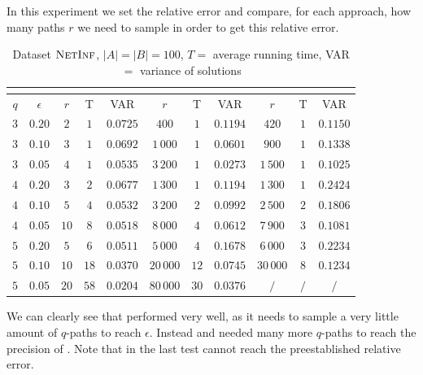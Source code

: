 In this experiment we set the relative error and compare, for each approach, how many paths $r$ we need to sample in order to get this relative error.\medskip

\begin{table}[ht]
	\centering
	\begin{tabular}{|c|c|c|c|c|c|c|c|c|c|c|}
		\cline{3-11}
		\multicolumn{2}{c|}{} & \multicolumn{3}{c|}{\fcount} & \multicolumn{3}{c|}{\fsamp} & \multicolumn{3}{c|}{\base}\\
		\hline	
		$q$ & $\epsilon$ & $r$ & T    & VAR      & $r$ & T    & VAR      & $r$ & T   & VAR      \\ \hline
		$3$ & $0.20$     & $2$  & $1$  & $0.0725$ & $400$     & $1$  & $0.1194$ & $420$     & $1$ & $0.1150$ \\ \hline
		$3$ & $0.10$     & $3$  & $1$  & $0.0692$ & $1\,000$  & $1$  & $0.0601$ & $900$     & $1$ & $0.1338$ \\ \hline
		$3$ & $0.05$     & $4$  & $1$  & $0.0535$ & $3\,200$  & $1$  & $0.0273$ & $1\,500$  & $1$ & $0.1025$ \\ \hline
		\hline
		$4$ & $0.20$     & $3$  & $2$  & $0.0677$ & $1\,300$  & $1$  & $0.1194$ & $1\,300$  & $1$ & $0.2424$ \\ \hline
		$4$ & $0.10$     & $5$  & $4$  & $0.0532$ & $3\,200$  & $2$  & $0.0992$ & $2\,500$  & $2$ & $0.1806$ \\ \hline
		$4$ & $0.05$     & $10$ & $8$  & $0.0518$ & $8\,000$  & $4$  & $0.0612$ & $7\,900$  & $3$ & $0.1081$ \\ \hline
		\hline
		$5$ & $0.20$     & $5$  & $6$  & $0.0511$ & $5\,000$  & $4$  & $0.1678$ & $6\,000$  & $3$ & $0.2234$ \\ \hline
		$5$ & $0.10$     & $10$ & $18$ & $0.0370$ & $20\,000$ & $12$ & $0.0745$ & $30\,000$ & $8$ & $0.1234$ \\ \hline
		$5$ & $0.05$     & $20$ & $58$ & $0.0204$ & $80\,000$ & $30$ & $0.0376$ & $/$       & $/$ & $/$      \\ \hline
	\end{tabular}
	\caption{Dataset $\textsc{NetInf}$, $|A| = |B| = 100$, $T = $ average running time, VAR $ = $ variance of solutions}
\end{table}
\medskip

We can clearly see that \fcount performed very well, as it needs to sample a very little amount of $q$-paths to reach $\epsilon$.
Instead \fsamp and \base needed many more $q$-paths to reach the precision of \fcount. Note that in the last test \base cannot reach the preestablished relative error.\bigskip

